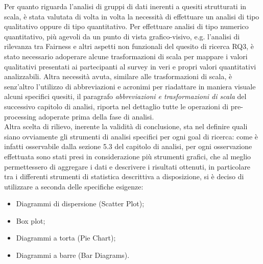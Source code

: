 Per quanto riguarda l'analisi di gruppi di dati inerenti a quesiti strutturati in scala, è stata valutata di volta in volta la necessità di effettuare un analisi di tipo qualitativo oppure di tipo quantitativo. Per effettuare analisi di tipo numerico quantitativo, più agevoli da un punto di vista grafico-visivo, e.g. l'analisi di rilevanza tra Fairness e altri aspetti non funzionali del quesito di ricerca RQ3, è stato necessario adoperare alcune trasformazioni di scala per mappare i valori qualitativi presentati ai partecipanti al survey in veri e propri valori quantitativi analizzabili. Altra necessità avuta, similare alle trasformazioni di scala, è senz'altro l'utilizzo di abbreviazioni e acronimi per riadattare in maniera visuale alcuni specifici quesiti, il paragrafo \emph{abbreviazioni e trasformazioni di scala} del successivo capitolo di analisi, riporta nel dettaglio tutte le operazioni di pre-processing adoperate prima della fase di analisi.\\

Altra scelta di rilievo, inerente la validità di conclusione, sta nel definire quali siano ovviamente gli strumenti di analisi specifici per ogni goal di ricerca: come è infatti osservabile dalla sezione 5.3 del capitolo di analisi, per ogni osservazione effettuata sono stati presi in considerazione più strumenti grafici, che al meglio permettessero di aggregare i dati e descrivere i risultati ottenuti, in particolare tra i differenti strumenti di statistica descrittiva a disposizione, si è deciso di utilizzare a seconda delle specifiche esigenze:
\begin{itemize}
    \item Diagrammi di dispersione (Scatter Plot);
    \item Box plot;
    \item Diagrammi a torta (Pie Chart);
    \item Diagrammi a barre (Bar Diagrams).
\end{itemize}
